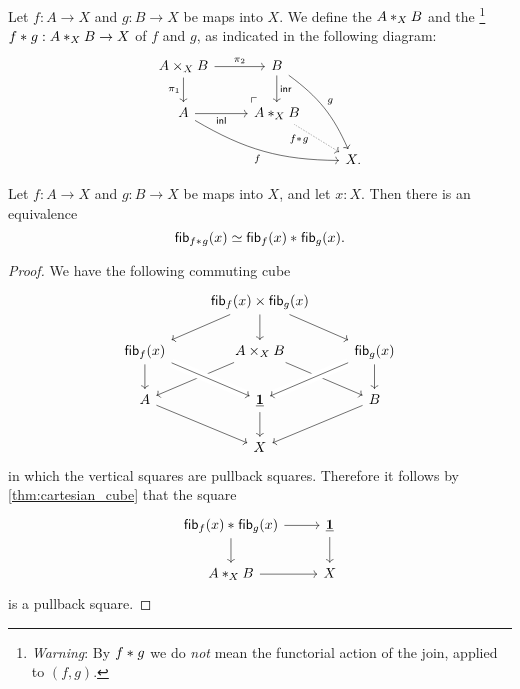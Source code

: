 \begin{defn}\label{defn:fib_join}
Let $f:A\to X$ and $g:B\to X$ be maps into $X$. We define the  $\join[X]{A}{B}$ and the \footnote{\emph{Warning}: By $\join{f}{g}$ we do \emph{not} mean the functorial action of the
join, applied to $(f,g)$.} $\join{f}{g}:\join[X]{A}{B}\to X$ of
$f$ and $g$, as indicated in the following diagram:
\begin{equation*}
\begin{tikzcd}
A\times_X B \arrow[r,"\pi_2"] \arrow[d,swap,"\pi_1"] \arrow[dr, phantom, "{\ulcorner}", at end] & B \arrow[d,"\inr"] \arrow[ddr,bend left=15,"g"] \\
A \arrow[r,swap,"\inl"] \arrow[drr,bend right=15,swap,"f"] & \join[X]{A}{B} \arrow[dr,densely dotted,swap,near start,"\join{f}{g}" xshift=1ex] \\
& & X.
\end{tikzcd}
\end{equation*}
\end{defn}

\begin{thm}\label{defn:join-fiber}
Let $f:A\to X$ and $g:B\to X$ be maps into $X$, and let $x:X$. Then there is
an equivalence
\begin{equation*}
\eqv{\fib{\join{f}{g}}{x}}{\join{\fib{f}{x}}{\fib{g}{x}}}.
\end{equation*}
\end{thm}

\begin{proof}
We have the following commuting cube
\begin{equation*}
\begin{tikzcd}
& \fib{f}{x}\times\fib{g}{x} \arrow[dl] \arrow[d] \arrow[dr] \\
\fib{f}{x} \arrow[d] & A\times_X B \arrow[dl] \arrow[dr] & \fib{g}{x} \arrow[dl,crossing over] \arrow[d] \\
A \arrow[dr] & \unit \arrow[d] \arrow[from=ul,crossing over] & B \arrow[dl] \\
& X
\end{tikzcd}
\end{equation*}
in which the vertical squares are pullback squares. Therefore it follows by \cref{thm:cartesian_cube} that the square
\begin{equation*}
\begin{tikzcd}
\join{\fib{f}{x}}{\fib{g}{x}} \arrow[r] \arrow[d] & \unit \arrow[d] \\
\join[X]{A}{B} \arrow[r] & X
\end{tikzcd}
\end{equation*}
is a pullback square.
\end{proof}

